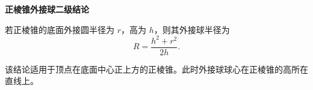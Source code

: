 \textbf{正棱锥外接球二级结论}

若正棱锥的底面外接圆半径为 $r$，高为 $h$，则其外接球半径为
\[
	R=\frac{h^2+r^2}{2h}.
\]

该结论适用于顶点在底面中心正上方的正棱锥。此时外接球球心在正棱锥的高所在直线上。